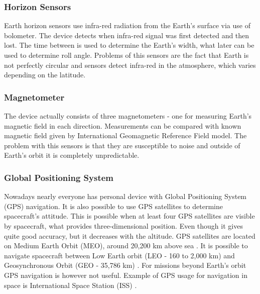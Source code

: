 \documentclass[12pt,a4paper,oneside]{article}
\begin{document}
\subsubsection{Horizon Sensors}
Earth horizon sensors use infra-red radiation from the Earth's surface via use of bolometer. The device detects when infra-red signal was first detected and then lost. The time between is used to determine the Earth's width, what later can be used to determine roll angle. Problems of this sensors are the fact that Earth is not perfectly circular and sensors detect infra-red in the atmosphere, which varies depending on the latitude.
\subsubsection{Magnetometer}
The device actually consists of three magnetometers - one for measuring Earth's magnetic field in each direction. Measurements can be compared with known magnetic field given by International Geomagnetic Reference Field model. The problem with this sensors is that they are susceptible to noise and outside of Earth's orbit it is completely unpredictable.
\subsubsection{Global Positioning System }
Nowadays nearly everyone has personal device with Global Positioning System (GPS) navigation. It is also possible to use GPS satellites to determine spacecraft's attitude. This is possible when at least four GPS satellites are visible by spacecraft, what provides three-dimensional position. Even though it gives quite good accuracy, but it decreases with the altitude. GPS satellites are located on Medium Earth Orbit (MEO), around 20,200 km above sea \cite{gps-gov}. It is possible to navigate spacecraft between Low Earth orbit (LEO -  160 to 2,000 km) and Geosynchronous Orbit (GEO - 35,786 km) \cite{nasa-gps-navigation}. For missions beyond Earth's orbit GPS navigation is however not useful. Example of GPS usage for navigation in space is International Space Station (ISS) \cite{iss-gps}.
\end{document}
